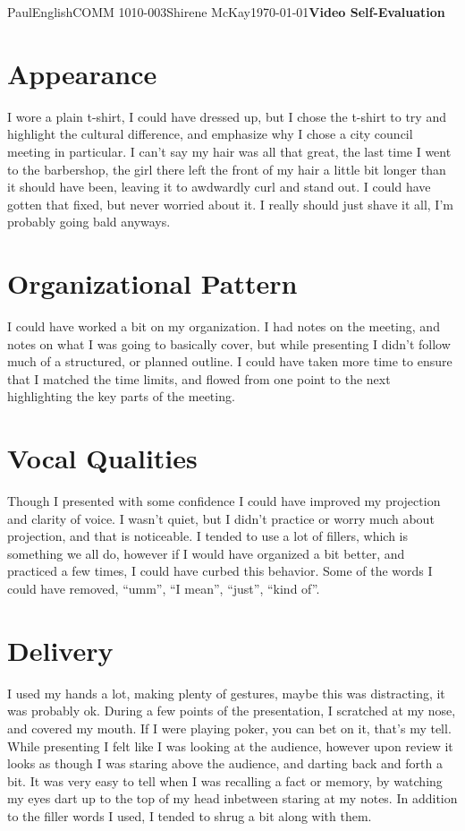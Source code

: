 \documentclass[12pt,letterpaper]{article}
\begin{document}
\begin{mla}{Paul}{English}{COMM 1010-003}{Shirene McKay}{\today}{\textbf{Video Self-Evaluation}}

\section{Appearance}
I wore a plain t-shirt, I could have dressed up, but I chose the
t-shirt to try and highlight the cultural difference, and emphasize
why I chose a city council meeting in particular. I can't say my hair
was all that great, the last time I went to the barbershop, the girl
there left the front of my hair a little bit longer than it should
have been, leaving it to awdwardly curl and stand out. I could have
gotten that fixed, but never worried about it. I really should just
shave it all, I'm probably going bald anyways.

\section{Organizational Pattern}
I could have worked a bit on my organization. I had notes on the
meeting, and notes on what I was going to basically cover, but while
presenting I didn't follow much of a structured, or planned outline. I
could have taken more time to ensure that I matched the time limits,
and flowed from one point to the next highlighting the key parts of
the meeting.

\section{Vocal Qualities}
Though I presented with some confidence I could have improved my
projection and clarity of voice. I wasn't quiet, but I didn't practice
or worry much about projection, and that is noticeable. I tended to
use a lot of fillers, which is something we all do, however if I would
have organized a bit better, and practiced a few times, I could have
curbed this behavior. Some of the words I could have removed, ``umm'',
``I mean'', ``just'', ``kind of''.

\section{Delivery}
I used my hands a lot, making plenty of gestures, maybe this was
distracting, it was probably ok. During a few points of the
presentation, I scratched at my nose, and covered my mouth. If I were
playing poker, you can bet on it, that's my tell. While presenting I
felt like I was looking at the audience, however upon review it looks
as though I was staring above the audience, and darting back and forth
a bit. It was very easy to tell when I was recalling a fact or memory,
by watching my eyes dart up to the top of my head inbetween staring at
my notes. In addition to the filler words I used, I tended to shrug a
bit along with them.


\end{mla}
\end{document}
